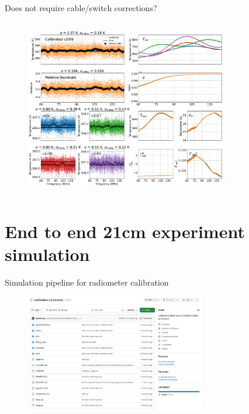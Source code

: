 \documentclass[aspectratio=169]{beamer}
\begin{document}
\begin{frame}{\small{Does not require cable/switch corrections?}}
	\begin{columns}
		\begin{column}{0.5\textwidth}
			\begin{figure}
				\centering
				\includegraphics[width=0.9\textwidth]{images/temps.pdf}
			\end{figure}
		\end{column}
		\begin{column}{0.5\textwidth}
			\begin{figure}
				\centering
				
			\end{figure}
		\end{column}
	\end{columns}
\end{frame}

\section{End to end 21cm experiment simulation}

\begin{frame}{\small{Simulation pipeline for radiometer calibration}}
	\begin{figure}
		\centering
		\includegraphics[width=0.7\textwidth]{images/githubrepo.png}
	\end{figure}
\end{frame}
\end{document}

